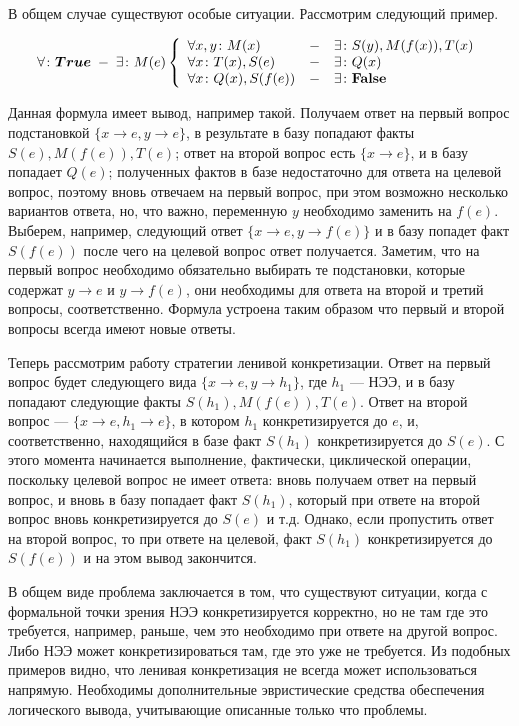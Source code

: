 В общем случае существуют особые ситуации. Рассмотрим следующий пример.
\begin{example}\label{example:uhe1}
$$\forall\colon\boldsymbol{True} \; - \; \exists\colon M(e) \left\{
\begin{array}{lcl}
 \forall x,y\colon M(x) & - & \exists\colon S(y),M(f(x)),T(x) \\
 \forall x \colon T(x),S(e) & - & \exists\colon Q(x) \\
 \forall x \colon Q(x),S(f(e)) & - & \exists\colon\textbf{False}
\end{array}
\right.$$

Данная формула имеет вывод, например такой. Получаем ответ на первый вопрос подстановкой $\{ x\rightarrow e, y\rightarrow e \}$, в результате в базу попадают факты $S(e),M(f(e)),T(e)$; ответ на второй вопрос есть $\{ x \rightarrow e\}$, и в базу попадает $Q(e)$; полученных фактов в базе недостаточно для ответа на целевой вопрос, поэтому вновь отвечаем на первый вопрос, при этом возможно несколько вариантов ответа, но, что важно, переменную $y$ необходимо заменить на $f(e)$. Выберем, например, следующий ответ $\{x \rightarrow e, y \rightarrow f(e) \}$ и в базу попадет факт $S(f(e))$ после чего на целевой вопрос ответ получается. Заметим, что на первый вопрос необходимо обязательно выбирать те подстановки, которые содержат $y \rightarrow e$ и $y \rightarrow f(e)$, они необходимы для ответа на второй и третий вопросы, соответственно. Формула устроена таким образом что первый и второй вопросы всегда имеют новые ответы.

Теперь рассмотрим работу стратегии ленивой конкретизации. Ответ на первый вопрос будет следующего вида $\{ x\rightarrow e, y\rightarrow h_1 \}$, где $h_1$ --- НЭЭ, и в базу попадают следующие факты $S(h_1),M(f(e)),T(e)$. Ответ на второй вопрос --- $\{ x\rightarrow e, h_1\rightarrow e \}$, в котором $h_1$ конкретизируется до $e$, и, соответственно, находящийся в базе факт $S(h_1)$ конкретизируется до $S(e)$. С этого момента начинается выполнение, фактически, циклической операции, поскольку целевой вопрос не имеет ответа: вновь получаем ответ на первый вопрос, и вновь в базу попадает факт $S(h_1)$, который при ответе на второй вопрос вновь конкретизируется до $S(e)$ и т.д. Однако, если пропустить ответ на второй вопрос, то при ответе на целевой, факт $S(h_1)$ конкретизируется до $S(f(e))$ и на этом вывод закончится.
\end{example}


В общем виде проблема заключается в том, что существуют ситуации, когда с формальной точки зрения НЭЭ конкретизируется корректно, но не там где это требуется, например, раньше, чем это необходимо при ответе на другой вопрос. Либо НЭЭ может конкретизироваться там, где это уже не требуется. Из подобных примеров видно, что ленивая конкретизация не всегда может использоваться напрямую. Необходимы дополнительные эвристические средства обеспечения логического вывода, учитывающие описанные только что проблемы.


